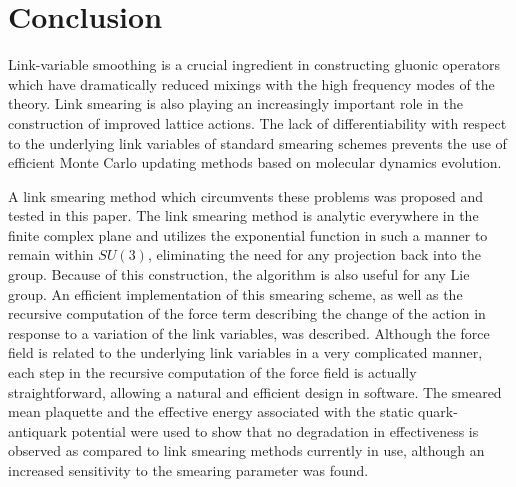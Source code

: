\section{Conclusion}
\label{sec:conclude}

Link-variable smoothing is a crucial ingredient in constructing
gluonic operators which have dramatically reduced mixings with
the high frequency modes of the theory.  Link smearing is also
playing an increasingly important role in the construction of
improved lattice actions.  The lack of differentiability with respect
to the underlying link variables of standard smearing schemes
prevents the use of efficient Monte Carlo updating methods based
on molecular dynamics evolution.  

A link smearing method which circumvents these problems was proposed and
tested in this paper. The link smearing method is analytic everywhere in
the finite complex plane and utilizes the exponential function in such a
manner to remain within $SU(3)$, eliminating the need for any projection
back into the group.  Because of this construction, the algorithm is
also useful for any Lie group. An efficient implementation of this
smearing scheme, as well as the recursive computation of the force term
describing the change of the action in response to a variation of the link
variables, was described.  Although the force field is related to the
underlying link variables in a very complicated manner, each step
in the recursive computation of the force field is actually straightforward,
allowing a natural and efficient design in software.  The smeared mean
plaquette and the effective energy associated with the static 
quark-antiquark potential were used to show that no degradation in
effectiveness is observed as compared to link smearing
methods currently in use, although an increased sensitivity to the
smearing parameter was found.

